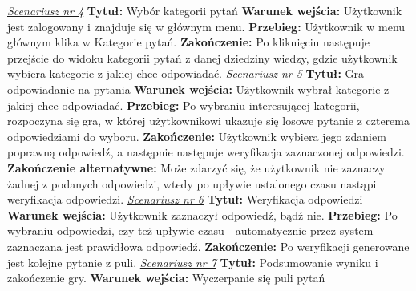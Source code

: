 \newline\newline \textit{\underline{Scenariusz nr 4}}
\newline \textbf{Tytuł:} Wybór kategorii pytań
\newline \textbf{Warunek wejścia:} Użytkownik jest zalogowany i znajduje się w głównym menu.
\newline \textbf{Przebieg:} Użytkownik w menu głównym klika w Kategorie pytań.
\newline \textbf{Zakończenie:} Po kliknięciu następuje przejście do widoku kategorii pytań z danej dziedziny wiedzy, gdzie użytkownik wybiera kategorie z jakiej chce odpowiadać.
\newline\newline \textit{\underline{Scenariusz nr 5}}
\newline \textbf{Tytuł:} Gra - odpowiadanie na pytania
\newline \textbf{Warunek wejścia:} Użytkownik wybrał kategorie z jakiej chce odpowiadać.
\newline \textbf{Przebieg:} Po wybraniu interesującej kategorii, rozpoczyna się gra, w której użytkownikowi ukazuje się losowe pytanie z czterema odpowiedziami do wyboru.   
\newline \textbf{Zakończenie:} Użytkownik wybiera jego zdaniem poprawną odpowiedź, a następnie następuje weryfikacja zaznaczonej odpowiedzi.
\newline \textbf{Zakończenie alternatywne:} Może zdarzyć się, że użytkownik nie zaznaczy żadnej z podanych odpowiedzi, wtedy po upływie ustalonego czasu nastąpi weryfikacja odpowiedzi. 
\newline\newline \textit{\underline{Scenariusz nr 6}}
\newline \textbf{Tytuł:} Weryfikacja odpowiedzi
\newline \textbf{Warunek wejścia:} Użytkownik zaznaczył odpowiedź, bądź nie.
\newline \textbf{Przebieg:} Po wybraniu odpowiedzi, czy też upływie czasu - automatycznie przez system zaznaczana jest prawidłowa odpowiedź.
\newline \textbf{Zakończenie:} Po weryfikacji generowane jest kolejne pytanie z puli. 
\newline\newline \textit{\underline{Scenariusz nr 7}}
\newline \textbf{Tytuł:} Podsumowanie wyniku i zakończenie gry.
\newline \textbf{Warunek wejścia:} Wyczerpanie się puli pytań
